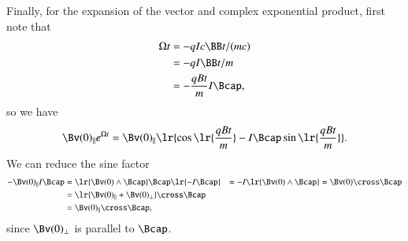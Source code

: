 {Finally, for the expansion of the vector and complex exponential product, first note that
\begin{equation}\label{eqn:lorentzForce_constantMagneticProblem:60}
\begin{aligned}
\Omega t
&= - q I c \BB t/(m c) \\
&= - q I \BB t/m \\
&= - \frac{q B t}{m} I \Bcap,
\end{aligned}
\end{equation}
so we have
\begin{equation}\label{eqn:lorentzForce_constantMagneticProblem:80}
\Bv(0)_\parallel e^{\Omega t}
=
\Bv(0)_\parallel \lr{ \cos \lr{ \frac{q B t}{m} } - I \Bcap \sin \lr{ \frac{q B t}{m} } }.
\end{equation}
We can reduce the sine factor
\begin{equation}\label{eqn:lorentzForce_constantMagneticProblem:100}
\begin{aligned}
- \Bv(0)_\parallel I \Bcap
&=
\lr{ \Bv(0) \wedge \Bcap } \Bcap \lr{ -I \Bcap }
&=
-I \lr{ \Bv(0) \wedge \Bcap }
&=
\Bv(0) \cross \Bcap \\
&=
\lr{ \Bv(0)_\parallel + \Bv(0)_\perp } \cross \Bcap \\
&=
\Bv(0)_\parallel \cross \Bcap,
\end{aligned}
\end{equation}
since \( \Bv(0)_\perp \) is parallel to \( \Bcap \).
} %
